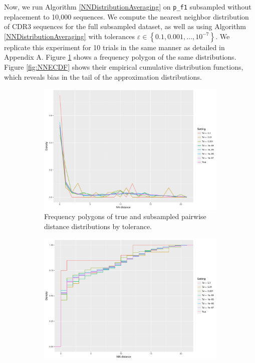 \documentclass{article}
\begin{document}
Now, we run Algorithm \ref{NNDistributionAveraging} on \texttt{p\_f1} subsampled without replacement to 10,000 sequences.
We compute the nearest neighbor distribution of CDR3 sequences for the full subsampled dataset, as well as using Algorithm \ref{NNDistributionAveraging} with tolerances $\varepsilon \in \left\{0.1, 0.001, \dotsc, 10^{-7} \right\}$.
We replicate this experiment for 10 trials in the same manner as detailed in Appendix A.
Figure \ref{fig:NNFreqPoly} shows a frequency polygon of the same distributions.
Figure \ref{fig:NNECDF} shows their empirical cumulative distribution functions, which reveals bias in the tail of the approximation distributions.

\begin{figure}
    \begin{subfigure}{.5\textwidth}
        \includegraphics[width=\linewidth]{Figures/NearestNeighbor/CDR3/freqpoly_by_tol.pdf}
   		\caption{Frequency polygons of true and subsampled pairwise distance distributions by tolerance.}
    	\label{fig:NNFreqPoly}
    \end{subfigure}
    \begin{subfigure}{.5\textwidth}
        \includegraphics[width=\linewidth]{Figures/NearestNeighbor/CDR3/ecdf_by_tol.pdf}

\end{subfigure}
\end{figure}
\end{document}
